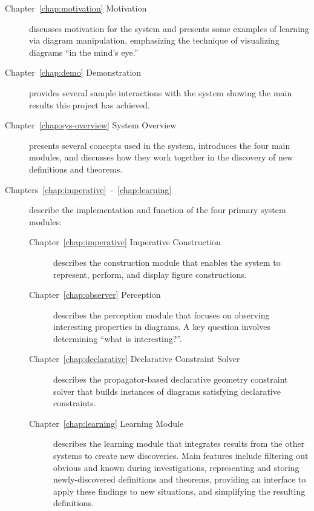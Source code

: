 \begin{description}

\item [Chapter~\ref{chap:motivation} Motivation] discusses motivation
  for the system and presents some examples of learning via diagram
  manipulation, emphasizing the technique of visualizing diagrams ``in
  the mind's eye.''

\item [Chapter~\ref{chap:demo} Demonstration] provides several sample
  interactions with the system showing the main results this project
  has achieved.

\item[Chapter~\ref{chap:sys-overview} System Overview] presents
  several concepts used in the system, introduces the four main
  modules, and discusses how they work together in the discovery of
  new definitions and theorems.

\item[Chapters~\ref{chap:imperative}~-~\ref{chap:learning}] describe
  the implementation and function of the four primary system modules:

\begin{description}
\item[Chapter~\ref{chap:imperative} Imperative Construction]
  describes the construction module that enables the system to
  represent, perform, and display figure constructions.

\item[Chapter~\ref{chap:observer} Perception] describes the perception
  module that focuses on observing interesting properties in
  diagrams. A key question involves determining ``what is
  interesting?''.

\item[Chapter~\ref{chap:declarative} Declarative Constraint Solver]
  describes the propagator-based declarative geometry constraint
  solver that builds instances of diagrams satisfying declarative
  constraints.

\item[Chapter~\ref{chap:learning} Learning Module] describes the
  learning module that integrates results from the other systems to
  create new discoveries. Main features include filtering out obvious
  and known during investigations, representing and storing
  newly-discovered definitions and theorems, providing an interface to
  apply these findings to new situations, and simplifying the
  resulting definitions.

\end{description}
\newpage


\end{description}
